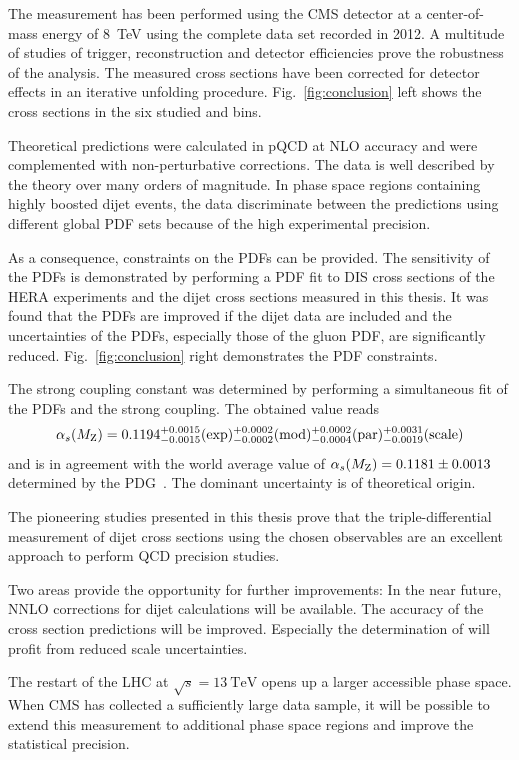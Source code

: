 The measurement has been performed using the CMS detector at a center-of-mass
energy of \SI{8}{\TeV} using the complete data set recorded in 2012. A multitude
of studies of trigger, reconstruction and detector efficiencies prove the
robustness of the analysis. The measured cross sections have been corrected for
detector effects in an iterative unfolding procedure. Fig.~\ref{fig:conclusion}
left shows the cross sections in the six studied \ystar and \yboost bins.

Theoretical predictions were calculated in pQCD at NLO accuracy and were
complemented with non-perturbative corrections. The data is well
described by the theory over many orders of magnitude. In phase space regions
containing highly boosted dijet events, the data discriminate between the
predictions using different global PDF sets because of the high experimental
precision.

As a consequence, constraints on the PDFs can be provided. The sensitivity of
the PDFs is demonstrated by performing a PDF fit to DIS cross sections of the
HERA experiments and the dijet cross sections measured in this thesis. It was
found that the PDFs are improved if the dijet data are included and the
uncertainties of the PDFs, especially those of the gluon PDF, are
significantly reduced. Fig.~\ref{fig:conclusion} right demonstrates the PDF
constraints.

The strong coupling constant \asmz was determined by performing a simultaneous
fit of the PDFs and the strong coupling. The obtained value reads
%
\begin{equation*}
  \alpha_{s}(M_\mathrm{Z}) = 0.1194_{-0.0015}^{+0.0015}(\mathrm{exp})_{-0.0002}^{+0.0002}(\mathrm{mod})_{-0.0004}^{+0.0002}(\mathrm{par})_{-0.0019}^{+0.0031}(\mathrm{scale})
\end{equation*}
%
and is in agreement with the world average value of $\alpha_{s}(M_\mathrm{Z}) = 0.1181 \pm
0.0013$ determined by the PDG~\cite{Agashe:2014kda}. The dominant uncertainty is
of theoretical origin.

The pioneering studies presented in this thesis prove that the triple-differential
measurement of dijet cross sections using the chosen observables are an
excellent approach to perform QCD precision studies.

Two areas provide the opportunity for further improvements: In the near future,
NNLO corrections for dijet calculations will be available. The accuracy of the
cross section predictions will be improved. Especially the determination of
\asmz will profit from reduced scale uncertainties. 

The restart of the LHC at $\sqrt{s}=\SI{13}{\TeV}$ opens up a larger accessible
phase space. When CMS has collected a sufficiently large data sample, it will be
possible to extend this measurement to additional phase space regions and
improve the statistical precision.

